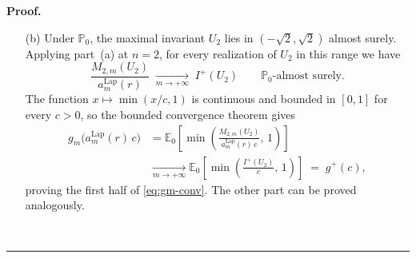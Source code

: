 \documentclass{article}%
\newenvironment{proof}[1][Proof]{\noindent\textbf{#1.} }{\ \rule{0.5em}{0.5em}}
\newcommand{\E}{\mathbb{E}}
\newcommand{\Lap}{\mathrm{Lap}}
\newcommand{\1}{\mathbf{1}}
\begin{document}
\begin{proof}
\begin{enumerate}
\textbf{Strict monotonicity in $|u_n|$.} The parabolic cylinder function 
$D_{-n}$ admits, for every fixed $n \geq 1$, the integral representation
\[
  D_{-n}(\zeta) \;=\; \frac{e^{-\zeta^{2}/4}}{\Gamma(n)}\, \phi_n(\zeta),
  \qquad
  \phi_n(\zeta) \;:=\; \int_{0}^{\infty} t^{\,n-1}\, e^{-t^{2}/2 - \zeta t}\, dt,
\]
and $\phi_n(\zeta) > 0$ for every $\zeta \in \mathbb{R}$. The Gaussian
prefactor $e^{-\zeta^{2}/4}$ is even in $\zeta$, hence cancels in the ratio, giving
\[
  \frac{I^{+}(u_n)}{I^{-}(u_n)}
  \;=\;
  \frac{D_{-n}(-z_n)}{D_{-n}(+z_n)}
  \;=\;
  \frac{\phi_n(-z_n)}{\phi_n(+z_n)},
\]
with $z_n = z_n(\kappa, u_n)$. Differentiating $\phi_n$ under the integral 
sign is justified by the Gaussian envelope $e^{-t^{2}/2}$ and yields
\[
  \phi_n'(\zeta)
  \;=\;
  -\int_{0}^{\infty} t^{\,n}\, e^{-t^{2}/2 - \zeta t}\, dt
  \;<\; 0,
  \qquad \zeta \in \mathbb{R},
\]
so $\phi_n$ is strictly decreasing on the whole real line. The map 
$u_n \mapsto z_n(\kappa, u_n) = \kappa u_n / \sqrt{n(n - u_n^{2})}$ is 
strictly increasing on $(-\sqrt{n}, \sqrt{n})$, since
\[
  \partial_{u_n} z_n(\kappa, u_n)
  \;=\;
  \frac{\kappa \sqrt{n}}{(n - u_n^{2})^{3/2}}
  \;>\; 0
\]
for $\kappa > 0$. Hence the ratio $\phi_n(-z_n)/\phi_n(+z_n)$ is the ratio 
of a strictly decreasing function evaluated at $-z_n$ and at $+z_n$, 
which is strictly monotone in $z_n$ and therefore in $u_n$. It equals $1$ 
at $u_n = 0$, where $z_n = 0$, and diverges from $1$ as $|u_n|$ grows. 
This completes the proof.


\item[(b)] Under $\mathbb{P}_0$, the maximal invariant $U_2$ lies in $(-\sqrt 2,\sqrt 2)$
almost surely. Applying part~(a) at $n=2$, for every realization of
$U_2$ in this range we have
\begin{equation}\label{eq:M2-conv-as}
  \frac{M_{2,m}(U_2)}{a_m^{\Lap}(r)}
  \;\xrightarrow[m\to+\infty]{}\; I^+(U_2)
  \qquad \mathbb{P}_0\text{-almost surely.}
\end{equation}
The function $x\mapsto\min(x/c,1)$ is continuous and bounded in
$[0,1]$ for every $c>0$, so the bounded convergence theorem gives
\begin{align*}
  g_m\!\bigl(a_m^{\Lap}(r)\,c\bigr)
  &= \E_0\!\left[\min\!\left(\frac{M_{2,m}(U_2)}{a_m^{\Lap}(r)\,c},\,1\right)\right] \\
  &\xrightarrow[m\to+\infty]{}
  \E_0\!\left[\min\!\left(\frac{I^+(U_2)}{c},\,1\right)\right]
  \;=\; g^+(c),
\end{align*}
proving the first half of \eqref{eq:gm-conv}. The other part can be proved analogously.


\end{enumerate}
\end{proof}
\end{document}
